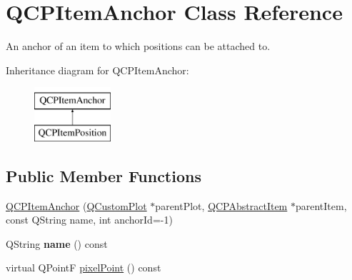 \hypertarget{classQCPItemAnchor}{\section{\-Q\-C\-P\-Item\-Anchor \-Class \-Reference}
\label{classQCPItemAnchor}
}


\-An anchor of an item to which positions can be attached to.  


\-Inheritance diagram for \-Q\-C\-P\-Item\-Anchor\-:\begin{figure}[H]
\begin{center}
\leavevmode
\includegraphics[height=2.000000cm]{classQCPItemAnchor}
\end{center}
\end{figure}
\subsection*{\-Public \-Member \-Functions}
\begin{DoxyCompactItemize}
\item 
\hyperlink{classQCPItemAnchor_aeb6b681d2bf324db40a915d32ec5624f}{\-Q\-C\-P\-Item\-Anchor} (\hyperlink{classQCustomPlot}{\-Q\-Custom\-Plot} $\ast$parent\-Plot, \hyperlink{classQCPAbstractItem}{\-Q\-C\-P\-Abstract\-Item} $\ast$parent\-Item, const \-Q\-String name, int anchor\-Id=-\/1)
\item 
\hypertarget{classQCPItemAnchor_ac93984042a58c875e76847dc3e5f75fe}{\-Q\-String {\bfseries name} () const }\label{classQCPItemAnchor_ac93984042a58c875e76847dc3e5f75fe}

\item 
virtual \-Q\-Point\-F \hyperlink{classQCPItemAnchor_ae92def8f9297c5d73f5806c586517bb3}{pixel\-Point} () const 
\end{DoxyCompactItemize}
